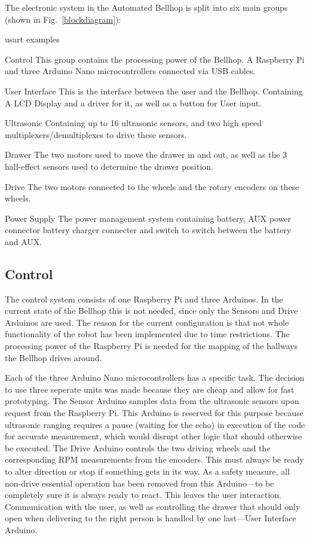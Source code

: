 \documentclass[11pt]{article}
\begin{document}
The electronic system in the Automated Bellhop is split into six main groups (shown in Fig.~\ref{blockdiagram}):
\begin{labeling}{usart examples}
\item [Control] This group contains the processing power of the Bellhop. A Raspberry Pi  and three Arduino Nano microcontrollers connected via USB cables.
\item [User Interface] This is the interface between the user and the Bellhop. Containing A LCD Display and a driver for it, as well as a button for User input.
\item [Ultrasonic] Containing up to 16 ultrasonic sensors, and two high speed multiplexers/demultiplexes to drive these sensors.
\item [Drawer] The two motors used to move the drawer in and out, as well as the 3 hall-effect sensors used to determine the drawer position.
\item [Drive] The two motors connected to the wheels and the rotary encoders on these wheels.
\item [Power Supply] The power management system containing battery, AUX power connector battery charger connecter and switch to switch between the battery and AUX.
\end{labeling}
\subsection*{Control}
The control system consists of one Raspberry Pi and three Arduinos. In the current state of the Bellhop this is not needed, since only the Sensors and Drive Arduinos are used. The reason for the current configuration is that not whole functionality of the robot has been implemented due to time restrictions. The processing power of the Raspberry Pi is needed for the mapping of the hallways the Bellhop drives around.


Each of the three Arduino Nano microcontrollers has a specific task. The decision to use three seperate units was made because they are cheap and allow for fast prototyping. The Sensor Arduino samples data from the ultrasonic sensors upon request from the Raspberry Pi. This Arduino is reserved for this purpose because ultrasonic ranging requires a pause (waiting for the echo) in execution of the code for accurate measurement, which would disrupt other logic that should otherwise be executed. The Drive Arduino controls the two driving wheels and the corresponding RPM measurements from the encoders. This must always be ready to alter direction or stop if something gets in its way. As a safety measure, all non-drive essential operation has been removed from this Arduino---to be completely sure it is always ready to react. This leaves the user interaction. Communication with the user, as well as controlling the drawer that should only open when delivering to the right person is handled by one last---User Interface Arduino.
\end{document}
